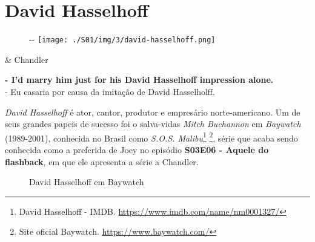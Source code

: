 \hypertarget{david-hasselhoff}{%
\section{David Hasselhoff}\label{david-hasselhoff}}

\begin{figure}[!ht]
  \begin{adjustwidth}{-\oddsidemargin-1in}{-\rightmargin}
    \centering
    \texttt{[image: ./S01/img/3/david-hasselhoff.png]}
  \end{adjustwidth}
\end{figure}

\begin{tcolorbox}[enhanced,center upper,
    drop fuzzy shadow southeast, boxrule=0.3pt,
    lower separated=false,
    colframe=black!30!dialogoBorder,colback=white]
\begin{minipage}[c]{0.16\linewidth}
   & \centering \scriptsize{Chandler}
\end{minipage}
\hfill
\begin{minipage}[c]{0.8\linewidth}
  \textbf{- I'd marry him just for his David Hasselhoff impression alone.}\\
  - Eu casaria por causa da imitação de David Hasselholff.
\end{minipage}
\end{tcolorbox}

\emph{David Hasselhoff} é ator, cantor, produtor e empresário
norte-americano. Um de seus grandes papeis de sucesso foi o salva-vidas
\emph{Mitch Buchannon} em \emph{Baywatch} (1989-2001), conhecida no
Brasil como \emph{S.O.S. Malibu}\footnote{\sloppy David Hasselhoff - IMDB. \url{https://www.imdb.com/name/nm0001327/}}
\footnote{\sloppy Site oficial Baywatch. \url{https://www.baywatch.com/}},
série que acaba sendo conhecida como a preferida de Joey no episódio
\textbf{\textcolor{primarycolor}{S03E06 - Aquele do flashback}}, em que
ele apresenta a série a Chandler.

\begin{figure}
  \centering
    \caption{David Hasselhoff em Baywatch\label{fig:david-hasselhoff-em-baywatch}}
\end{figure}

